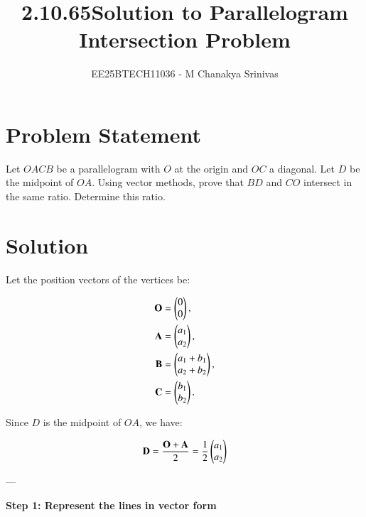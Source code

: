\documentclass[journal]{IEEEtran}
\begin{document}

\vspace{3cm}

\title{2.10.65}
\author{EE25BTECH11036 - M Chanakya Srinivas}
\maketitle

\renewcommand{\thetable}{\theenumi}
\setlength{\intextsep}{10pt}
\renewcommand\theequation{\arabic{equation}}



\title{Solution to Parallelogram Intersection Problem}
\author{}
\date{}
\maketitle

\section*{Problem Statement}
Let $OACB$ be a parallelogram with $O$ at the origin and $OC$ a diagonal. Let $D$ be the midpoint of $OA$. Using vector methods, prove that $BD$ and $CO$ intersect in the same ratio. Determine this ratio.

\section*{Solution}

Let the position vectors of the vertices be:

\begin{align}
\mathbf{O} &= \begin{pmatrix}0\\0\end{pmatrix}, \\
\mathbf{A} &= \begin{pmatrix}a_1\\a_2\end{pmatrix}, \\
\mathbf{B} &= \begin{pmatrix}a_1 + b_1\\a_2 + b_2\end{pmatrix}, \\
\mathbf{C} &= \begin{pmatrix}b_1\\b_2\end{pmatrix}.
\end{align}

Since $D$ is the midpoint of $OA$, we have:

\begin{align}
\mathbf{D} = \frac{\mathbf{O} + \mathbf{A}}{2} = \frac{1}{2} \begin{pmatrix}a_1\\a_2\end{pmatrix}
\end{align}

---

\textbf{Step 1: Represent the lines in vector form}
\end{document}
